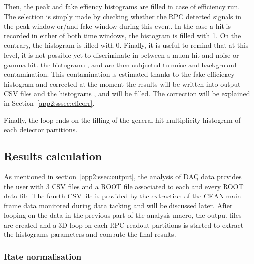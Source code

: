 	Then, the peak and fake effiency histograms are filled in case of efficiency run. The selection is simply made by checking whether the RPC detected signals in the peak window or/and fake window during this event. In the case a hit is recorded in either of both time windows, the histogram is filled with 1. On the contrary, the histogram is filled with 0. Finally, it is useful to remind that at this level, it is not possible yet to discriminate in between a muon hit and noise or gamma hit. the histograms ,  and  are then subjected to noise and background contamination. This contamination is estimated thanks to the fake efficiency histogram  and corrected at the moment the results will be written into output CSV files and the histograms ,  and  will be filled. The correction will be explained in Section~\ref{app2:sssec:effcorr}.
	
	Finally, the loop ends on the filling of the general hit multiplicity histogram of each detector partitions.
	
	\subsection{Results calculation}
	\label{app2:ssec:rate}
		
	As mentioned in section~\ref{app2:ssec:output}, the analysis of DAQ data provides the user with 3 CSV files and a ROOT file associated to each and every ROOT data file. The fourth CSV file is provided by the extraction of the CEAN main frame data monitored during data tacking and will be discussed later. After looping on the data in the previous part of the analysis macro, the output files are created and a 3D loop on each RPC readout partitions is started to extract the histograms parameters and compute the final results.\\
	
		\subsubsection{Rate normalisation}
		\label{app2:sssec:norm}
		
\begingroup\setlength{\intextsep}{5pt}\setlength{\columnsep}{15pt}
	
